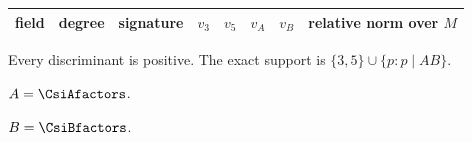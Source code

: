 \begingroup
\small
\setlength{\tabcolsep}{6pt}
\renewcommand{\arraystretch}{1.15}
\begin{tabular}{@{}lrrrrrrc@{}}
\toprule
field & degree & signature & $v_3$ & $v_5$ & $v_A$ & $v_B$ & relative norm over $M$ \\
\midrule
%
\end{tabular}
\par\smallskip
\footnotesize Every discriminant is positive.  The exact support is
$\{3,5\}\cup\{p:p\mid A B\}$.
\par $A=\CsiAfactors$.
\par $B=\CsiBfactors$.
\endgroup
